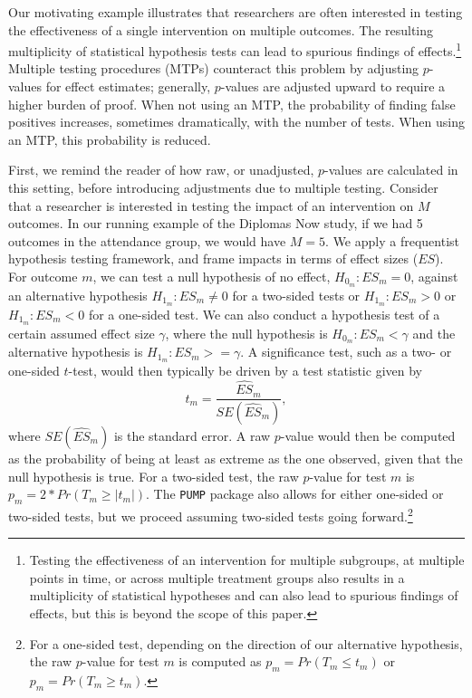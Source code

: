 \documentclass[
]{article}
\begin{document}
Our motivating example illustrates that researchers are often interested
in testing the effectiveness of a single intervention on multiple
outcomes. The resulting multiplicity of statistical hypothesis tests can
lead to spurious findings of
effects.\footnote{Testing the effectiveness of an intervention for multiple subgroups, at multiple points in time, or across multiple treatment groups also results in a multiplicity of statistical hypotheses and can also lead to spurious findings of effects, but this is beyond the scope of this paper.}
Multiple testing procedures (MTPs) counteract this problem by adjusting
\(p\)-values for effect estimates; generally, \(p\)-values are adjusted
upward to require a higher burden of proof. When not using an MTP, the
probability of finding false positives increases, sometimes
dramatically, with the number of tests. When using an MTP, this
probability is reduced.

First, we remind the reader of how raw, or unadjusted, \(p\)-values are
calculated in this setting, before introducing adjustments due to
multiple testing. Consider that a researcher is interested in testing
the impact of an intervention on \(M\) outcomes. In our running example
of the Diplomas Now study, if we had 5 outcomes in the attendance group,
we would have \(M = 5\). We apply a frequentist hypothesis testing
framework, and frame impacts in terms of effect sizes (\(ES\)). For
outcome \(m\), we can test a null hypothesis of no effect,
\(H_{0_m}: ES_m = 0\), against an alternative hypothesis
\(H_{1_m}: ES_m \neq 0\) for a two-sided tests or \(H_{1_m}: ES_m > 0\)
or \(H_{1_m}: ES_m < 0\) for a one-sided test. We can also conduct a
hypothesis test of a certain assumed effect size \(\gamma\), where the
null hypothesis is \(H_{0_m}: ES_m < \gamma\) and the alternative
hypothesis is \(H_{1_m}: ES_m >= \gamma\). A significance test, such as
a two- or one-sided \(t\)-test, would then typically be driven by a test
statistic given by \begin{equation}
t_m = \frac{\widehat{ES}_m}{SE(\hat{ES}_m)},
\end{equation} where \(SE(\hat{ES}_m)\) is the standard error. A raw
\(p\)-value would then be computed as the probability of being at least
as extreme as the one observed, given that the null hypothesis is true.
For a two-sided test, the raw \(p\)-value for test \(m\) is
\(p_m=2*Pr(T_m \geq |t_m|)\). The \texttt{PUMP} package also allows for
either one-sided or two-sided tests, but we proceed assuming two-sided
tests going
forward.\footnote{For a one-sided test, depending on the direction of our alternative hypothesis, the raw $p$-value for test $m$ is computed as $p_m=Pr(T_m \leq t_m)$ or $p_m=Pr(T_m \geq t_m)$.}
\end{document}
